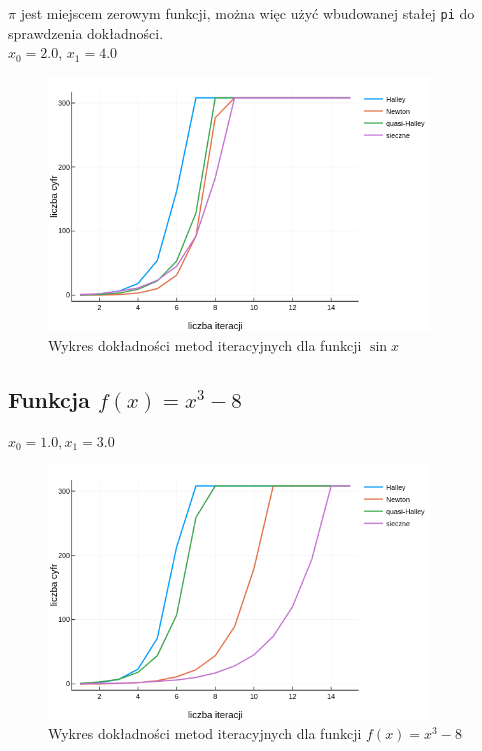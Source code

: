 \documentclass[11pt,a4paper]{article}
\begin{document}
    $\pi$ jest miejscem zerowym funkcji, można więc użyć wbudowanej stałej \verb!pi! do sprawdzenia dokładności.\\
    
    $x_0 = 2.0$, $x_1 = 4.0$\\

    

    \begin{figure}[H]
        \includegraphics[width=0.9\textwidth]{wykr2}
        \caption{Wykres dokładności metod iteracyjnych dla funkcji $\sin{x}$}
    \end{figure}

    \subsection{Funkcja $f(x)=x^3-8$}

   
    $x_0 = 1.0, x_1 = 3.0$

    
    \begin{figure}[H]
        \includegraphics[width=0.9\textwidth]{wykr3}
        \caption{Wykres dokładności metod iteracyjnych dla funkcji $f(x)=x^3-8$}
    \end{figure}
\end{document}

